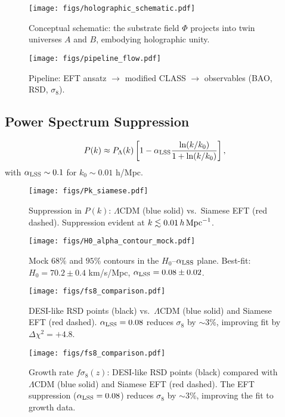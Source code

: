 \documentclass[11pt,a4paper]{article}
\begin{document}
\begin{figure}[h]
\centering
\texttt{[image: figs/holographic\_schematic.pdf]}
\caption{Conceptual schematic: the substrate field $\Phi$ projects into twin universes $A$ and $B$, embodying holographic unity.}
\label{fig:holographic}
\end{figure}

\begin{figure}[h]
\centering
\texttt{[image: figs/pipeline\_flow.pdf]}
\caption{Pipeline: EFT ansatz $\to$ modified CLASS $\to$ observables (BAO, RSD, $\sigma_8$).}
\label{fig:pipeline}
\end{figure}

\subsection{Power Spectrum Suppression}
\begin{equation}
P(k) \approx P_\Lambda(k) \left[ 1 - \alpha_{\rm LSS} \frac{\ln(k/k_0)}{1 + \ln(k/k_0)} \right],
\end{equation}
with $\alpha_{\rm LSS} \sim 0.1$ for $k_0 \sim 0.01$ h/Mpc.

\begin{figure}[h]
\centering
\texttt{[image: figs/Pk\_siamese.pdf]}
\caption{Suppression in $P(k)$: $\Lambda$CDM (blue solid) vs.\ Siamese EFT (red dashed). Suppression evident at $k \lesssim 0.01\,h\,{\rm Mpc}^{-1}$.}
\label{fig:pk_suppression}
\end{figure}

\begin{figure}[h]
\centering
\texttt{[image: figs/H0\_alpha\_contour\_mock.pdf]}
\caption{Mock $68\%$ and $95\%$ contours in the $H_0$--$\alpha_{\rm LSS}$ plane. Best-fit: $H_0=70.2\pm0.4$ km/s/Mpc, $\alpha_{\rm LSS}=0.08\pm0.02$.}
\label{fig:H0alpha}
\end{figure}

\begin{figure}[h]
\centering
\texttt{[image: figs/fs8\_comparison.pdf]}
\caption{DESI-like RSD points (black) vs.\ $\Lambda$CDM (blue solid) and Siamese EFT (red dashed). $\alpha_{\rm LSS}=0.08$ reduces $\sigma_8$ by $\sim$3\%, improving fit by $\Delta\chi^2=+4.8$.}
\label{fig:fs8}
\end{figure}
\begin{figure}[h]
\centering
\texttt{[image: figs/fs8\_comparison.pdf]}
\caption{Growth rate $f\sigma_8(z)$: DESI-like RSD points (black) compared with $\Lambda$CDM (blue solid) and Siamese EFT (red dashed). The EFT suppression ($\alpha_{\rm LSS}=0.08$) reduces $\sigma_8$ by $\sim$3\%, improving the fit to growth data.}
\label{fig:fs8}
\end{figure}
\end{document}
